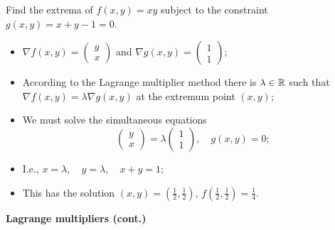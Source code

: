 \begin{example}
    Find the extrema of \(f(x,y) = xy\) subject to the constraint \(g(x,y) = x+y-1 =0\).
    \begin{itemize}
        \item \(\nabla f(x,y) = \left(\begin{smallmatrix}
                  y\\ x
              \end{smallmatrix}\right)\)
              and \(\nabla g(x,y) = \left(\begin{smallmatrix}
                  1\\ 1
              \end{smallmatrix}\right)\);
        \item  According to the Lagrange multiplier method there is \(\lambda\in \mathbb{R}\) such that \(\nabla f(x,y) = \lambda \nabla g(x,y)\) at the extremum point \((x,y)\);
        \item We must solve the simultaneous equations
              \[
                  \left(\begin{smallmatrix}
                          y\\ x
                      \end{smallmatrix}\right)
                  = \lambda \left(\begin{smallmatrix}
                          1\\ 1
                      \end{smallmatrix}\right),
                  \quad g(x,y) =0;
              \]
        \item I.e.,
              \( x = \lambda, \quad
              y = \lambda, \quad
              x+y = 1;
              \)
        \item This has the solution \((x,y) = (\frac{1}{2},\frac{1}{2})\), \(f(\frac{1}{2},\frac{1}{2})= \frac{1}{4}\).
    \end{itemize}
\end{example}




\textbf{Lagrange multipliers (cont.)}


